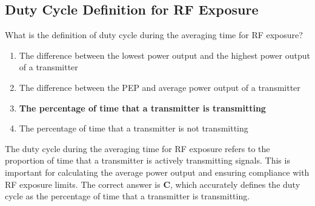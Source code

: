 \subsection{Duty Cycle Definition for RF Exposure}
\label{T0C11}

\begin{tcolorbox}[colback=gray!10!white,colframe=black!75!black,title=T0C11]
What is the definition of duty cycle during the averaging time for RF exposure?
\begin{enumerate}[noitemsep]
    \item The difference between the lowest power output and the highest power output of a transmitter
    \item The difference between the PEP and average power output of a transmitter
    \item \textbf{The percentage of time that a transmitter is transmitting}
    \item The percentage of time that a transmitter is not transmitting
\end{enumerate}
\end{tcolorbox}

The duty cycle during the averaging time for RF exposure refers to the proportion of time that a transmitter is actively transmitting signals. This is important for calculating the average power output and ensuring compliance with RF exposure limits. The correct answer is \textbf{C}, which accurately defines the duty cycle as the percentage of time that a transmitter is transmitting.